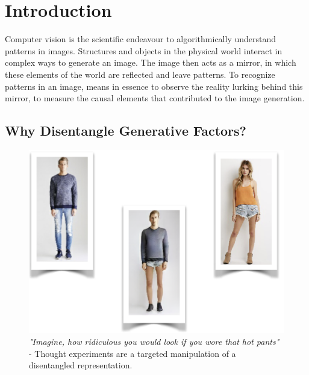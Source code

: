 \chapter{Introduction}\label{sec:introduction}
	Computer vision is the scientific endeavour to algorithmically understand patterns in images.
	Structures and objects in the physical world interact in complex ways to generate an image. The image then acts as a mirror, in which these elements of the world are reflected and leave patterns.
	To recognize patterns in an image, means in essence to observe the reality lurking behind this mirror, \ie to measure the causal elements that contributed to the image generation.


\section{Why Disentangle Generative Factors?}
	\begin{figure}[htp]
		\centering
		\includegraphics[trim={0cm 0cm 0cm 0cm},clip, width=0.5\linewidth]{fig/other/hotpants}
		\caption{\textit{"Imagine, how ridiculous you would look if you wore that hot pants"} - Thought experiments are a targeted manipulation of a disentangled representation.}
		\label{fig:hotpants}
	\end{figure}

